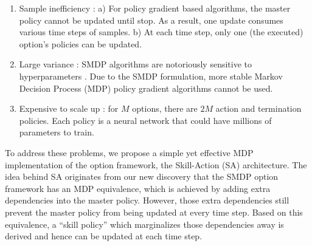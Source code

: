 \begin{enumerate}
\item Sample inefficiency \cite{zhang2019dac}: a) For policy
  gradient based algorithms, the master policy cannot be updated
  until stop. As a result, one update consumes various time steps
  of samples. b) At each time step, only one (the executed)
  option's policies can be updated.
\item Large variance
  \cite{zhang2019dac,haarnoja2018soft}: SMDP
  algorithms are notoriously sensitive to hyperparameters . Due
  to the SMDP formulation, more stable Markov Decision Process
  (MDP) policy gradient algorithms cannot be used.
\item Expensive to scale up \cite{riemer2018learning}: for $M$
  options, there are $2M$ action and termination policies. Each
  policy is a neural network that could have millions of
  parameters to train.
\end{enumerate}

To address these problems, we propose a simple yet effective MDP
implementation of the option framework, the Skill-Action (SA)
architecture. The idea behind SA originates from our new
discovery that the SMDP option framework has an MDP equivalence,
which is achieved by adding extra dependencies into the master
policy. However, those extra dependencies still prevent the
master policy from being updated at every time step. Based on
this equivalence, a ``skill policy'' which marginalizes those
dependencies away is derived and hence can be updated at each
time step.


